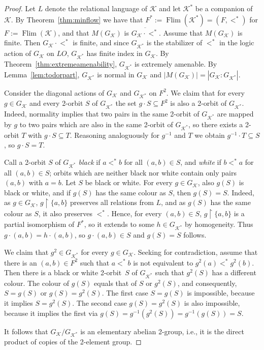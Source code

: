 \documentclass[12pt]{amsart}
\theoremstyle{plain}
\theoremstyle{definition}
\begin{document}
 
\begin{proof}
Let $L$ denote the relational language of ${\mathcal K}$ and let ${\mathcal K}^*$ be a companion of ${\mathcal K}$.
By Theorem~\ref{thm:minflow} we have that $F^*:=\operatorname{Flim}({\mathcal K}^*)=(F,<^*)$ for $F:=\operatorname{Flim}({\mathcal K})$,  and that
$M(G_{\mathcal K})$ is $\overline{G_{\mathcal K}\cdot <^*}$. Assume that $M(G_{\mathcal K})$ is finite.
Then $G_{\mathcal K}\cdot <^*$ is finite, and since $G_{{\mathcal K}^*}$ is the stabilizer of $<^*$ in 
the logic action of $G_{\mathcal K}$ on $\textit{LO}$, 
$G_{{\mathcal K}^*}$ has finite index in $G_{\mathcal K}$. 
By Theorem~\ref{thm:extremeamenability}, $G_{{\mathcal K}^*}$ is extremely amenable. 
By Lemma~\ref{lem:todorpart}, $G_{{\mathcal K}^*}$ is normal in $G_{\mathcal K}$ and $|M(G_{\mathcal K})|=|G_{\mathcal K}:G_{{\mathcal K}^*}|$.

Consider the diagonal actions of $G_{\mathcal K}$ and $G_{{\mathcal K}^*}$ on $F^2$. We claim that for every $g\in G_{\mathcal K}$ and 
every 2-orbit $S$ of $G_{{\mathcal K}^*}$ the set $g\cdot S\subseteq F^2$ is also a 2-orbit of $G_{{\mathcal K}^*}$. 
Indeed, normality implies that two pairs in the same 2-orbit of $G_{{\mathcal K}^*}$
are mapped by $g$ to two pairs which are also in the same 2-orbit of $G_{{\mathcal K}^*}$, so there exists 
 a 2-orbit $T$ with $g\cdot S\subseteq T$. 
Reasoning analoguously for $g^{-1}$ and $T$ we obtain $g^{-1}\cdot T\subseteq S$, so $g\cdot S=T$.

Call a  2-orbit $S$ of $G_{{\mathcal K}^*}$ {\em black} if $a<^*b$ for all $(a,b)\in S$, and {\em white} if 
$b<^*a$ for all $(a,b)\in S$; orbits which are neither black nor white contain only pairs $(a,b)$ with $a=b$.
Let $S$ be black or white. For every $g\in G_{\mathcal K}$, also $g(S)$ is black or white, and if $g(S)$
has the same colour as $S$, then $g(S)=S$. Indeed, as $g\in G_{\mathcal K}$, $g\upharpoonright\{a,b\}$ preserves 
all relations from $L$, and as $g(S)$ has the same colour as $S$, it also preserves $<^*$. Hence, for every $(a,b)\in S$,
$g\upharpoonright\{a,b\}$ is a partial isomorphism of $F^*$, so it extends to some $h\in G_{{\mathcal K}^*}$ 
by homogeneity. Thus $g\cdot (a,b)=h\cdot (a,b)$, so $g\cdot (a,b)\in S$ and $g(S)=S$ follows.

We claim that $g^2\in G_{{\mathcal K}^*}$ for every $g\in G_{\mathcal K}$. Seeking for contradiction, assume that 
there is an $(a,b)\in F^2$ such that $a<^*b$ is not equivalent to
$g^2(a)<^*g^2(b)$. Then there is a  black or white 2-orbit~$S$ of $G_{{\mathcal K}^*}$ such that $g^2(S)$ has a different colour.
The colour of $g(S)$ equals  that of $S$ or $g^2(S)$, and consequently, $S=g(S)$ or $g(S)=g^2(S)$. 
The first case $S=g(S)$ is impossible, because it implies $S=g^2(S)$. The second case $g(S)=g^2(S)$ is also
impossible, because it implies the first via
$g(S)=g^{-1}(g^2(S))=g^{-1}(g(S))=S$.

It follows that  $G_{\mathcal K}/G_{{\mathcal K}^*}$  is an elementary abelian 2-group, i.e., it is the direct product of copies of the 2-element group.
\end{proof}
\end{document}
